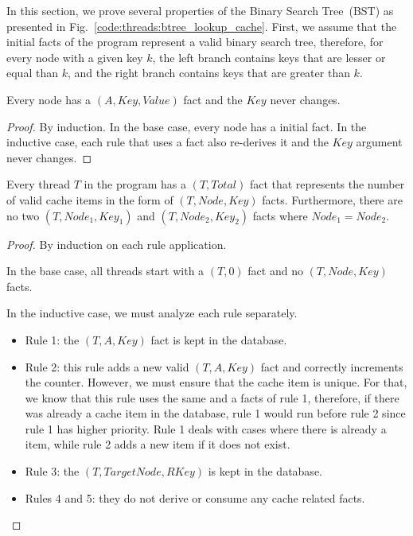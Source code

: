 In this section, we prove several properties of the Binary Search Tree~(BST) as
presented in Fig.~\ref{code:threads:btree_lookup_cache}. First, we assume that
the initial facts of the program represent a valid binary search tree,
therefore, for every node with a given key $k$, the left branch contains keys
that are lesser or equal than $k$, and the right branch contains keys that are
greater than $k$.

\begin{invariant}
Every node has a $(A, Key, Value)$ fact and the $Key$ never changes.
\end{invariant}
\begin{proof}
By induction. In the base case, every node has a  initial fact. In the
inductive case, each rule that uses a  fact also re-derives it and
the $Key$ argument never changes.
\end{proof}

\begin{invariant}\label{appendix:proof:key_value_invariant}
Every thread $T$ in the program has a $(T, Total)$ fact that
represents the number of valid cache items in the form of $(T, Node, Key)$
facts. Furthermore, there are no two $(T, Node_1, Key_1)$ and
$(T, Node_2, Key_2)$ facts where $Node_1 = Node_2$.
\end{invariant}
\begin{proof}
By induction on each rule application.

In the base case, all threads start with a $(T, 0)$ fact and no
$(T, Node, Key)$ facts.
 
In the inductive case, we must analyze each rule separately.

\begin{itemize}

  \item Rule 1: the $(T, A, Key)$ fact is kept in the database.

  \item Rule 2: this rule adds a new valid $(T, A, Key)$ fact and
     correctly increments the  counter. However, we must ensure
     that the cache item is unique. For that, we know that this rule uses the
     same  and a  facts of rule 1, therefore, if there
     was already a cache item in the database, rule 1 would run before rule 2
     since rule 1 has higher priority. Rule 1 deals with cases where there is
     already a  item, while rule 2 adds a new item if it does not
     exist.

   \item Rule 3: the $(T, TargetNode, RKey)$ is kept in the
      database.

   \item Rules 4 and 5: they do not derive or consume any cache related facts.

\end{itemize}
\end{proof}


